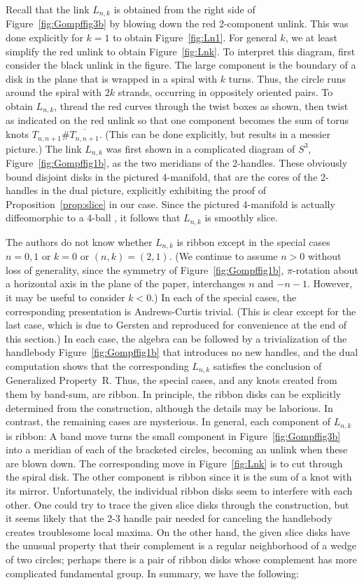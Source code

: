 \documentclass{amsart}
\begin{document}
Recall that the link $L_{n,k}$ is obtained from the right side of Figure~\ref{fig:Gompffig3b} by blowing down the red 2-component unlink. This was done explicitly for $k=1$ to obtain Figure~\ref{fig:Ln1}. For general $k$, we at least simplify the red unlink to obtain Figure~\ref{fig:Lnk}. To interpret this diagram, first consider the black unlink in the figure. The large component is the boundary of a disk in the plane that is wrapped in a spiral with $k$ turns. Thus, the circle runs around the spiral with $2k$  strands, occurring in oppositely oriented pairs. To obtain $L_{n,k}$, thread the red curves through the twist boxes as shown, then twist as indicated on the red unlink so that one component becomes the sum of torus knots $T_{n, n+1} \# \overline{T_{n, n+1}}$. (This can be done explicitly, but results in a messier picture.) The link $L_{n,k}$ was first shown in a complicated diagram of $S^3$, Figure~\ref{fig:Gompffig1b}, as the two meridians of the 2-handles. These obviously bound disjoint disks in the pictured 4-manifold, that are the cores of the 2-handles in the dual picture, explicitly exhibiting the proof of Proposition~\ref{prop:slice} in our case. Since the pictured 4-manifold is actually diffeomorphic to a 4-ball \cite{Go1}, it follows that $L_{n,k}$ is smoothly slice.

The authors do not know whether $L_{n,k}$ is ribbon except in the special cases $n=0,1$ or $k=0$ or $(n,k)=(2,1)$. (We continue to assume $n>0$ without loss of generality, since the symmetry of Figure~\ref{fig:Gompffig1b}, $\pi$-rotation about a horizontal axis in the plane of the paper, interchanges $n$ and $-n-1$. However, it may be useful to consider $k<0$.) In each of the special cases, the corresponding presentation is Andrews-Curtis trivial. (This is clear except for the last case, which is due to Gersten \cite{Ge} and reproduced for convenience at the end of this section.) In each case, the algebra can be followed by a trivialization of the handlebody Figure~\ref{fig:Gompffig1b} that introduces no new handles, and the dual computation shows that the corresponding $L_{n,k}$ satisfies the conclusion of Generalized Property~R. Thus, the special cases, and any knots created from them by band-sum, are ribbon. In principle, the ribbon disks can be explicitly determined from the construction, although the details may be laborious. In contrast, the remaining cases are mysterious. In general,  each component of $L_{n,k}$ is ribbon: A band move turns the small component in  Figure~\ref{fig:Gompffig3b} into a meridian of each of the bracketed circles, becoming an unlink when these are blown down. The corresponding move in Figure~\ref{fig:Lnk} is to cut through the spiral disk. The other component is ribbon since it is the sum of a knot with its mirror. Unfortunately, the individual ribbon disks seem to interfere with each other. One could try to trace the given slice disks through the construction, but it seems likely that the 2-3 handle pair needed for canceling the handlebody creates troublesome local maxima. On the other hand, the given slice disks have the unusual property that their complement is a regular neighborhood of a wedge of two circles; perhaps there is a pair of ribbon disks whose complement has more complicated fundamental group. In summary, we have the following:
\end{document}
